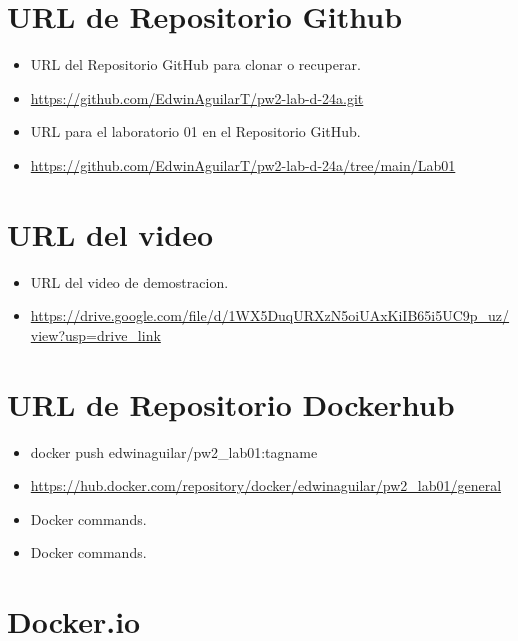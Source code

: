 \documentclass{article}
\begin{document}
\begin{itemize}
	\section{URL de Repositorio Github}
	\begin{itemize}
		\item URL del Repositorio GitHub para clonar o recuperar.
		\item \url{https://github.com/EdwinAguilarT/pw2-lab-d-24a.git}
		\item URL para el laboratorio 01 en el Repositorio GitHub.
		\item \url{https://github.com/EdwinAguilarT/pw2-lab-d-24a/tree/main/Lab01}
	\end{itemize}
 \section{URL del video}
	\begin{itemize}
		\item URL del video de demostracion.
		\item \url{https://drive.google.com/file/d/1WX5DuqURXzN5oiUAxKiIB65i5UC9p_uz/view?usp=drive_link}
		
	\end{itemize}

       \section{URL de Repositorio Dockerhub}
	\begin{itemize}
		\item docker push edwinaguilar/pw2_lab01:tagname

		\item \url{https://hub.docker.com/repository/docker/edwinaguilar/pw2_lab01/general}
		\item Docker commands.
		\item Docker commands.

	\end{itemize}
	
	\section{Docker.io}
	

\end{itemize}
\end{document}
